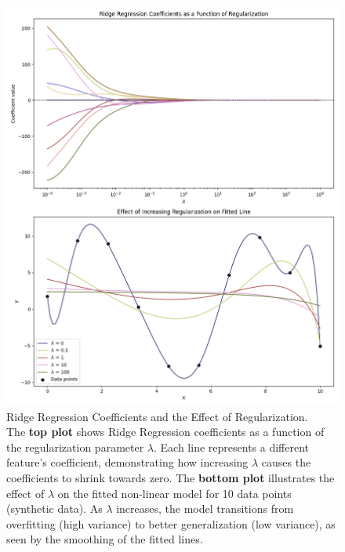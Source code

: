 \documentclass[english,11pt,a4paper,titlepage]{article}
\begin{document}
	\begin{figure}[!t]
		\centering
		\includegraphics[width=1.0\linewidth]{img/ridge_lambda_effect}
		\caption{Ridge Regression Coefficients and the Effect of Regularization. \\ The \textbf{top plot} shows Ridge Regression coefficients as a function of the regularization parameter $\lambda$. Each line represents a different feature's coefficient, demonstrating how increasing $\lambda$ causes the coefficients to shrink towards zero. The \textbf{bottom plot} illustrates the effect of $\lambda$ on the fitted non-linear model for 10 data points (synthetic data). As $\lambda$ increases, the model transitions from overfitting (high variance) to better generalization (low variance), as seen by the smoothing of the fitted lines.}
		\label{fig:ridgelambdaeffect}
	\end{figure}
	
\end{document}

